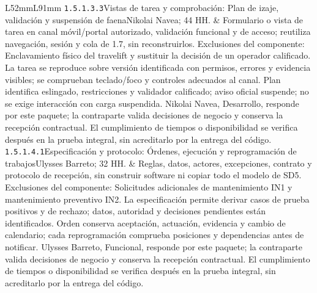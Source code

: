 \begin{longtable}{L{52mm}L{91mm}}
\texttt{1.\allowbreak{}5.\allowbreak{}1.\allowbreak{}3.\allowbreak{}3}\newline Vistas de tarea y comprobación: Plan de izaje, validación y suspensión de faena\newline Nikolai Navea; 44 HH. & Formulario o vista de tarea en canal móvil/portal autorizado, validación funcional y de acceso; reutiliza navegación, sesión y cola de 1.7, sin reconstruirlos. Exclusiones del componente: Enclavamiento físico del travelift y sustituir la decisión de un operador calificado. La tarea se reproduce sobre versión identificada con permisos, errores y evidencia visibles; se comprueban teclado/foco y controles adecuados al canal. Plan identifica eslingado, restricciones y validador calificado; aviso oficial suspende; no se exige interacción con carga suspendida. Nikolai Navea, Desarrollo, responde por este paquete; la contraparte valida decisiones de negocio y conserva la recepción contractual. El cumplimiento de tiempos o disponibilidad se verifica después en la prueba integral, sin acreditarlo por la entrega del código.\\\hline
\texttt{1.\allowbreak{}5.\allowbreak{}1.\allowbreak{}4.\allowbreak{}1}\newline Especificación y protocolo: Órdenes, ejecución y reprogramación de trabajos\newline Ulysses Barreto; 32 HH. & Reglas, datos, actores, excepciones, contrato y protocolo de recepción, sin construir software ni copiar todo el modelo de SD5. Exclusiones del componente: Solicitudes adicionales de mantenimiento IN1 y mantenimiento preventivo IN2. La especificación permite derivar casos de prueba positivos y de rechazo; datos, autoridad y decisiones pendientes están identificados. Orden conserva aceptación, actuación, evidencia y cambio de calendario; cada reprogramación comprueba posiciones y dependencias antes de notificar. Ulysses Barreto, Funcional, responde por este paquete; la contraparte valida decisiones de negocio y conserva la recepción contractual. El cumplimiento de tiempos o disponibilidad se verifica después en la prueba integral, sin acreditarlo por la entrega del código.\\\hline

\end{longtable}

